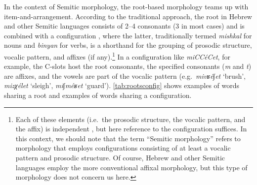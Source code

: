 \documentclass[output=paper,
modfonts
]{LSP/langsci}
\begin{document}
In the context of Semitic morphology, the root-based morphology teams up
with item-and-arrangement. According to the traditional approach, the
root in Hebrew and other Semitic languages consists of 2--4 consonants (3
in most cases) and is combined with a configuration \citep{batel2011a}, where
the latter, traditionally termed \emph{mishkal} for nouns and
\emph{binyan} for verbs, is a shorthand for the grouping of prosodic
structure, vocalic pattern, and affixes (if any).\footnote{Each of these
  elements (i.e.\ the prosodic structure, the vocalic pattern, and the
  affix) is independent \citep{McCarthy1979a,McCarthy1981b}, but here reference to the
  configuration suffices. In this context, we should note that the term
  ``Semitic morphology'' refers to morphology that employs configurations
  consisting of at least a vocalic pattern and prosodic structure. Of
  course, Hebrew and other Semitic languages employ the more
  conventional affixal morphology, but this type of morphology does not
  concern us here.} In a configuration like \emph{miCCéCet}, for
example, the C-slots host the root consonants, the specified consonants
(\emph{m} and \emph{t}) are affixes, and the vowels are part of the
vocalic pattern (e.g.\ \emph{mivʁé∫et} `brush', \emph{mizχélet} `sleigh',
\emph{mi∫méʁet} `guard'). \cref{tab:rootsconfig} shows examples of words sharing a root and examples of words sharing a configuration.
	
\end{document}
